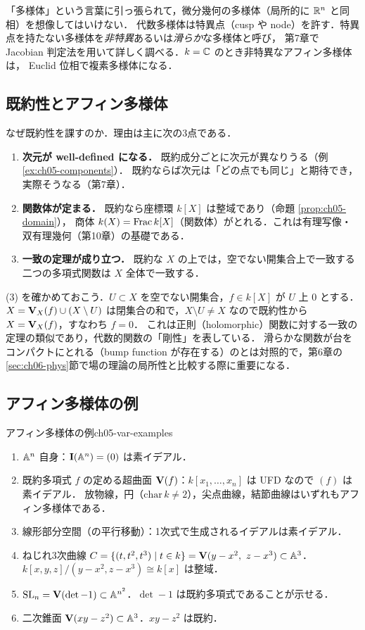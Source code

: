 「多様体」という言葉に引っ張られて，微分幾何の多様体（局所的に $\mathbb{R}^n$ と同相）を想像してはいけない．
代数多様体は特異点（cusp や node）を許す．特異点を持たない多様体を\emph{非特異}あるいは\emph{滑らか}な多様体と呼び，
第7章で Jacobian 判定法を用いて詳しく調べる．$k=\mathbb{C}$ のとき非特異なアフィン多様体は，
Euclid 位相で複素多様体になる．

\subsection{既約性とアフィン多様体}

なぜ既約性を課すのか．理由は主に次の3点である．
\begin{enumerate}
  \item \textbf{次元が well-defined になる．} 既約成分ごとに次元が異なりうる（例 \ref{ex:ch05-components}）．
        既約ならば次元は「どの点でも同じ」と期待でき，実際そうなる（第7章）．
  \item \textbf{関数体が定まる．} 既約なら座標環 $k[X]$ は整域であり（命題 \ref{prop:ch05-domain}），
        商体 $k(X)=\operatorname{Frac} k[X]$（関数体）がとれる．これは有理写像・双有理幾何（第10章）の基礎である．
  \item \textbf{一致の定理が成り立つ．} 既約な $X$ の上では，空でない開集合上で一致する二つの多項式関数は $X$ 全体で一致する．
\end{enumerate}

(3) を確かめておこう．$U\subset X$ を空でない開集合，$f\in k[X]$ が $U$ 上 $0$ とする．
$X=\mathbf{V}_X(f)\cup(X\setminus U)$ は閉集合の和で，$X\setminus U\neq X$ なので既約性から $X=\mathbf{V}_X(f)$，すなわち $f=0$．
これは正則（holomorphic）関数に対する一致の定理の類似であり，代数的関数の「剛性」を表している．
滑らかな関数が台をコンパクトにとれる（bump function が存在する）のとは対照的で，第6章の\ref{sec:ch06-phys}節で場の理論の局所性と比較する際に重要になる．

\subsection{アフィン多様体の例}

\begin{myex}{アフィン多様体の例}{ch05-var-examples}
\begin{enumerate}
  \item $\mathbb{A}^n$ 自身：$\mathbf{I}(\mathbb{A}^n)=(0)$ は素イデアル．
  \item 既約多項式 $f$ の定める超曲面 $\mathbf{V}(f)$：$k[x_1,\dots,x_n]$ は UFD なので $(f)$ は素イデアル．
        放物線，円（$\mathrm{char}\,k\neq 2$），尖点曲線，結節曲線はいずれもアフィン多様体である．
  \item 線形部分空間（の平行移動）：1次式で生成されるイデアルは素イデアル．
  \item ねじれ3次曲線 $C=\{(t,t^2,t^3)\mid t\in k\}=\mathbf{V}(y-x^2,\ z-x^3)\subset\mathbb{A}^3$．
        $k[x,y,z]/(y-x^2,z-x^3)\cong k[x]$ は整域．
  \item $\operatorname{SL}_n=\mathbf{V}(\det-1)\subset\mathbb{A}^{n^2}$．$\det-1$ は既約多項式であることが示せる．
  \item 二次錐面 $\mathbf{V}(xy-z^2)\subset\mathbb{A}^3$．$xy-z^2$ は既約．
\end{enumerate}
\end{myex}

